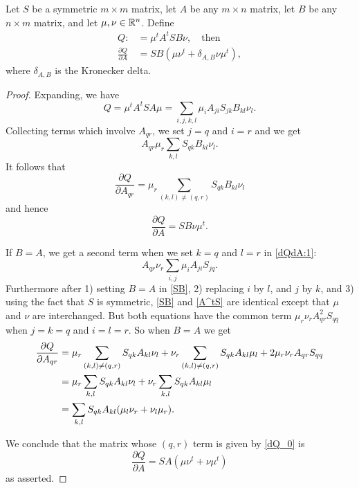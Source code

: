\documentclass[12pt,leqno]{article}
\begin{document}
\begin{Lem}\label{dQdA}
  Let $S$ be a symmetric $m\times{m}$ matrix, let $A$ be any $m\times{n}$ matrix,
  let $B$ be any ${n}\times{m}$ matrix,  and let $\mu,\nu\in {\mathbb R}^n$.  Define
  \begin{align*}
  Q :&= \mu^tA^tSB\nu,\quad\text{then}\\
  \frac{\partial{Q}}{\partial{A}} &= SB(\mu\nu^t+ \delta_{A,B}\nu\mu^t),
  \end{align*}
where $\delta_{A,B}$ is the Kronecker delta.
\end{Lem}
\begin{proof}
Expanding, we have
\begin{equation}\label{dQdA:1}
Q = \mu^tA^tSA\mu = \sum_{i,j,k,l}\mu_iA_{ji}S_{jk}B_{kl}\nu_l.
\end{equation}
Collecting terms which involve $A_{qr}$, we set $j=q$ and $i=r$ and we get
\begin{equation}\label{SB}
A_{qr}\mu_r\sum_{k,l}S_{qk}B_{kl}\nu_l.
\end{equation}
It follows that
$$
\frac{\partial Q}{\partial A_{qr}} = \mu_r\sum_{(k,l)\neq(q,r)}S_{qk}B_{kl}\nu_l
  $$
  and hence
  $$
  \frac{\partial Q}{\partial A} = SB\nu\mu^t.
  $$

  If $B = A$, we get a second term when we set $k=q$ and $l=r$ in \eqref{dQdA:1}:
  \begin{equation}\label{A^tS}
A_{qr}\nu_r\sum_{i,j}\mu_iA_{ji}S_{jq}.
\end{equation}
Furthermore after 1) setting $B=A$ in \eqref {SB}, 2) replacing $i$ by $l$, and $j$ by $k$, and 3) using the fact that $S$ is symmetric,
\eqref{SB} and \eqref{A^tS} are identical except that $\mu$ and $\nu$ are interchanged.
But both equations have the common term
$\mu_r\nu_rA_{qr}^2S_{qq}$ when $j = k = q$ and $i = l = r$.
So when $B = A$ we get 
\begin{align}
  \notag\frac{\partial{Q}}{\partial{A_{qr}}} &= \mu_r\sum_{(k,l)\neq(q,r)}S_{qk}A_{kl}\nu_l
  +\nu_r\sum_{(k,l)\neq(q,r)}S_{qk}A_{kl}\mu_l+ 2\mu_r\nu_rA_{qr}S_{qq}\\
  &= \mu_r\sum_{k,l}S_{qk}A_{kl}\nu_l + \nu_r\sum_{k,l}S_{qk}A_{kl}\mu_l\notag\\
  &= \sum_{k,l}S_{qk}A_{kl}(\mu_l\nu_r + \nu_l\mu_r).\label{dQ_0}
\end{align}

We conclude that the matrix whose $(q,r)$ term is given by \eqref{dQ_0} is
$$
\frac{\partial{Q}}{\partial{A}} = SA(\mu\nu^t+\nu\mu^t)
$$
as asserted.
\end{proof}
\end{document}
